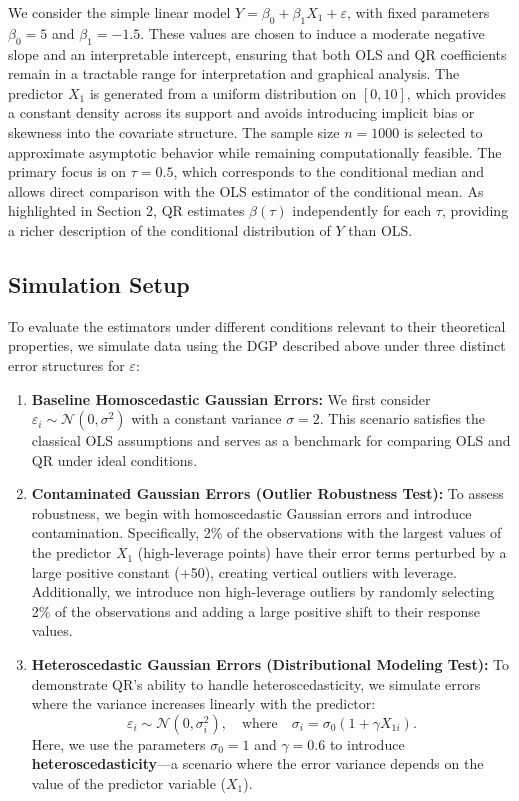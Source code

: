 \documentclass[fleqn,10pt]{latex/stylish_article} %
\begin{document}
We consider the simple linear model \(Y = \beta_0 + \beta_1 X_1 + \varepsilon\), with fixed parameters \(\beta_0 = 5\) and \(\beta_1 = -1.5\). These values are chosen to induce a moderate negative slope and an interpretable intercept, ensuring that both OLS and QR coefficients remain in a tractable range for interpretation and graphical analysis. The predictor \(X_1\) is generated from a uniform distribution on \([0,10]\), which provides a constant density across its support and avoids introducing implicit bias or skewness into the covariate structure. The sample size \(n = 1000\) is selected to approximate asymptotic behavior while remaining computationally feasible. The primary focus is on \(\tau = 0.5\), which corresponds to the conditional median and allows direct comparison with the OLS estimator of the conditional mean. As highlighted in Section 2, QR estimates \(\beta(\tau)\) independently for each \(\tau\), providing a richer description of the conditional distribution of \(Y\) than OLS.

\subsection{Simulation Setup}\label{simulation-setup}

To evaluate the estimators under different conditions relevant to their theoretical properties, we simulate data using the DGP described above under three distinct error structures for \(\varepsilon\):

\begin{enumerate}
\def\labelenumi{\arabic{enumi}.}
\item
  \textbf{Baseline Homoscedastic Gaussian Errors:} We first consider \(\varepsilon_i \sim \mathcal{N}(0, \sigma^2)\) with a constant variance \(\sigma = 2\). This scenario satisfies the classical OLS assumptions and serves as a benchmark for comparing OLS and QR under ideal conditions.
\item
  \textbf{Contaminated Gaussian Errors (Outlier Robustness Test):} To assess robustness, we begin with homoscedastic Gaussian errors and introduce contamination. Specifically, 2\% of the observations with the largest values of the predictor \(X_1\) (high-leverage points) have their error terms perturbed by a large positive constant (+50), creating vertical outliers with leverage. Additionally, we introduce non high-leverage outliers by randomly selecting 2\% of the observations and adding a large positive shift to their response values.
\item
  \textbf{Heteroscedastic Gaussian Errors (Distributional Modeling Test):}
  To demonstrate QR's ability to handle heteroscedasticity, we simulate errors where the variance increases linearly with the predictor:
  \[
  \varepsilon_i \sim \mathcal{N}(0, \sigma_i^2), \quad \text{where} \quad \sigma_i = \sigma_0 (1 + \gamma X_{1i}).
  \]
  Here, we use the parameters \(\sigma_0 = 1\) and \(\gamma = 0.6\) to introduce \textbf{heteroscedasticity}---a scenario where the error variance depends on the value of the predictor variable (\(X_1\)).
\end{enumerate}
\end{document}
